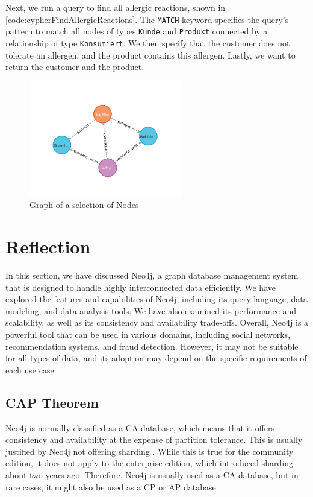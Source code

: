 Next, we run a query to find all allergic reactions, shown in \autoref{code:cypherFindAllergicReactions}. The \texttt{MATCH} keyword specifies the query's pattern to match all nodes of types \texttt{Kunde} and \texttt{Produkt} connected by a relationship of type \texttt{Konsumiert}. We then specify that the customer does not tolerate an allergen, and the product contains this allergen. Lastly, we want to return the customer and the product.

\begin{figure}[H]
    \centering
    \caption{Graph of a selection of Nodes} \label{fig:neo4jGraph_2}
    \includegraphics[width=0.6\textwidth]{images/neo4j_example_graph_2.png}
\end{figure}

\section{Reflection} \label{sec:reflectionNeo4j}

In this section, we have discussed Neo4j, a graph database management system that is designed to handle highly interconnected data efficiently. We have explored the features and capabilities of Neo4j, including its query language, data modeling, and data analysis tools. We have also examined its performance and scalability, as well as its consistency and availability trade-offs. Overall, Neo4j is a powerful tool that can be used in various domains, including social networks, recommendation systems, and fraud detection. However, it may not be suitable for all types of data, and its adoption may depend on the specific requirements of each use case.

\subsection{CAP Theorem} \label{subsec:capTheoremNeo4j}

Neo4j is normally classified as a \ac{CA}-database, which means that it offers consistency and availability at the expense of partition tolerance. This is usually justified by Neo4j not offering sharding \parencite{cap_neo4j}. While this is true for the community edition, it does not apply to the enterprise edition, which introduced sharding about two years ago. Therefore, Neo4j is usually used as a \ac{CA}-database, but in rare cases, it might also be used as a \ac{CP} or \ac{AP} database \parencite{consistency_models_cap_neo4j}.

